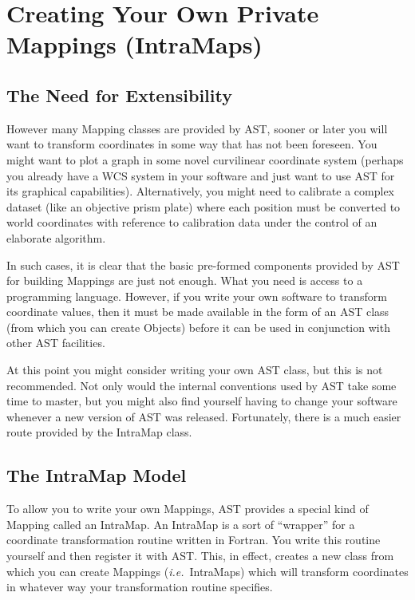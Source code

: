 \documentclass[twoside,11pt]{article}
\newcommand{\htmlref}[2]{#1}
\begin{document}
\cleardoublepage
\section{\label{ss:intramaps}Creating Your Own Private Mappings (IntraMaps)}

\subsection{The Need for Extensibility}

However many \htmlref{Mapping}{Mapping} classes are provided by AST, sooner or later you
will want to transform coordinates in some way that has not been
foreseen. You might want to plot a graph in some novel curvilinear
coordinate system (perhaps you already have a WCS system in your
software and just want to use AST for its graphical capabilities).
Alternatively, you might need to calibrate a complex dataset (like an
objective prism plate) where each position must be converted to world
coordinates with reference to calibration data under the control of an
elaborate algorithm.

In such cases, it is clear that the basic pre-formed components
provided by AST for building Mappings are just not enough. What you
need is access to a programming language. However, if you write your
own software to transform coordinate values, then it must be made
available in the form of an AST class (from which you can create
Objects) before it can be used in conjunction with other AST
facilities.

At this point you might consider writing your own AST class, but this
is not recommended. Not only would the internal conventions used by
AST take some time to master, but you might also find yourself having
to change your software whenever a new version of AST was
released. Fortunately, there is a much easier route provided by the
\htmlref{IntraMap}{IntraMap} class.

\subsection{The IntraMap Model}

To allow you to write your own Mappings, AST provides a special kind
of \htmlref{Mapping}{Mapping} called an \htmlref{IntraMap}{IntraMap}. An IntraMap is a sort of ``wrapper''
for a coordinate transformation routine written in Fortran. You write
this routine yourself and then register it with AST. This, in effect,
creates a new class from which you can create Mappings
({\em{i.e.}}\ IntraMaps) which will transform coordinates in whatever
way your transformation routine specifies.
\end{document}
